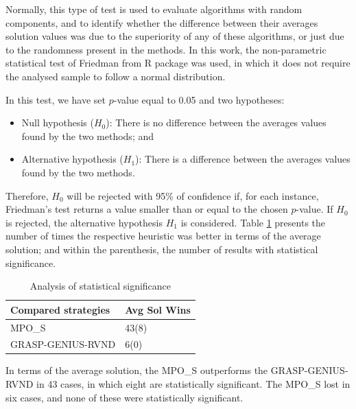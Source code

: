 \documentclass{singlecol-new}
\theoremstyle{TH}{
\newtheorem{lemma}{Lemma}
\newtheorem{theorem}[lemma]{Theorem}
\newtheorem{corrolary}[lemma]{Corrolary}
\newtheorem{conjecture}[lemma]{Conjecture}
\newtheorem{proposition}[lemma]{Proposition}
\newtheorem{claim}[lemma]{Claim}
\newtheorem{stheorem}[lemma]{Wrong Theorem}
}
\theoremstyle{THrm}{
\newtheorem{definition}{Definition}[section]
\newtheorem{question}{Question}[section]
\newtheorem{remark}{Remark}
\newtheorem{scheme}{Scheme}
}
\theoremstyle{THhit}{
\newtheorem{case}{Case}[section]
}
\begin{document}
Normally, this type of test is used to evaluate algorithms with random components, and to identify whether the difference between their averages solution values was due to the superiority of any of these algorithms, or just due to the randomness present in the methods. In this work, the non-parametric statistical test of Friedman \citep{siegal1956nonparametric} from  R package \citep{r-package} was used, in which it does not require the analysed sample to follow a normal distribution.

In this test, we have set $p$-value equal to 0.05 and two hypotheses:

{\small
\begin{itemize}
\item Null hypothesis ($ H_0 $): There is no difference between the averages values found by the two methods; and

\item Alternative hypothesis ($ H_1 $): There is a difference between the averages values found by the two methods.

\end{itemize}
}

Therefore, $H_0$ will be rejected with 95\% of confidence if, for each instance, Friedman's test returns a value smaller than or equal to the chosen $p$-value. If $H_0$ is rejected, the alternative hypothesis $H_1$ is considered.  Table \ref{tab:sig} presents the number of times the respective heuristic was better in terms of the average solution; and within the parenthesis, the number of results with statistical significance.




\begin{table}[h]
	\centering
	\caption{Analysis of statistical significance}
	\label{tab:sig}
	{\footnotesize
	\begin{tabular}{ll}
		\hline
		Compared strategies & Avg Sol Wins \\
		\hline 

		MPO\_S           & 43(8)        \\
		GRASP-GENIUS-RVND   & 6(0)    \\
		\hline   
	\end{tabular}
}
\end{table}

In terms of the average solution, the MPO\_S outperforms the GRASP-GENIUS-RVND in 43 cases, in which eight are statistically significant. The MPO\_S lost in six cases, and  none of these were statistically significant.
\end{document}
